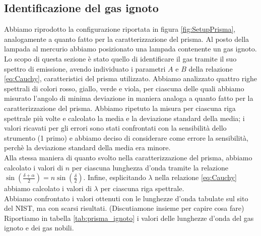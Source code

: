\documentclass[letterpaper,12pt]{article}
\begin{document}
\subsection{Identificazione del gas ignoto}
Abbiamo riprodotto la configurazione riportata in figura \ref{fig:SetupPrisma}, analogamente a quanto fatto per la 
caratterizzazione del prisma. Al posto della lampada al mercurio abbiamo posizionato una lampada contenente un gas
ignoto. Lo scopo di questa sezione è stato quello di identificare il gas tramite il suo spettro di emissione, avendo 
individuato i parametri $A$ e $B$ della relazione \ref{eq:Cauchy}, caratteristici del prisma utilizzato.
Abbiamo analizzato quattro righe spettrali di colori rosso, giallo, verde e viola, per ciascuna delle quali abbiamo
misurato l'angolo di minima deviazione in maniera analoga a quanto fatto per la caratterizzazione del prisma. Abbiamo 
ripetuto la misura per ciascuna riga spettrale più volte e calcolato la media e la deviazione standard della media; i
valori ricavati per gli errori sono stati confrontati con la sensibilità dello strumento (1 primo) e abbiamo deciso di
considerare come errore la sensibilità, perchè la deviazione standard della media era minore. \\
Alla stessa maniera di quanto svolto nella caratterizzazione del prisma, abbiamo calcolato i valori di $n$ per ciascuna
lunghezza d'onda tramite la relazione $\sin(\frac{\delta + \alpha}{2}) = n \sin(\frac{\delta}{2})$. Infine, esplicitando
$\lambda$ nella relazione \ref{eq:Cauchy} abbiamo calcolato i valori di $\lambda$ per ciascuna riga spettrale. \\
Abbiamo confrontato i valori ottenuti con le lunghezze d'onda tabulate sul sito del NIST, ma con scarsi risultati.
(Discutiamone insieme per capire cosa fare)
Riportiamo in tabella \ref{tab:prisma_ignoto} i valori delle lunghezze d'onda del gas ignoto e dei gas nobili.
\end{document}
